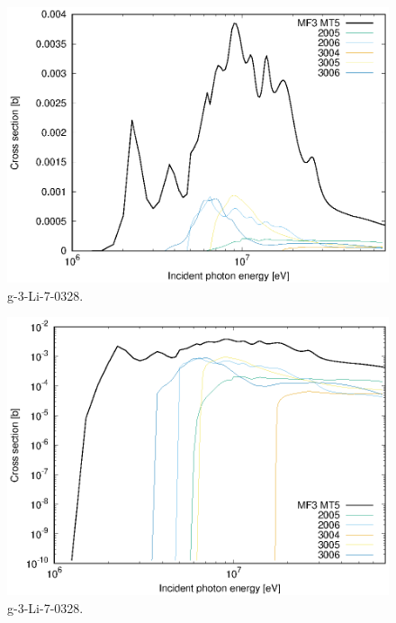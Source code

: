 \begin{figure}
 \includegraphics[width=\linewidth]{eps/g_3-Li-7_0328.eps}
  \caption{g-3-Li-7-0328.}
\end{figure}
\begin{figure}
 \includegraphics[width=\linewidth]{eps-log/g_3-Li-7_0328.eps}
 \caption{g-3-Li-7-0328.}
\end{figure}
\newpage \clearpage

